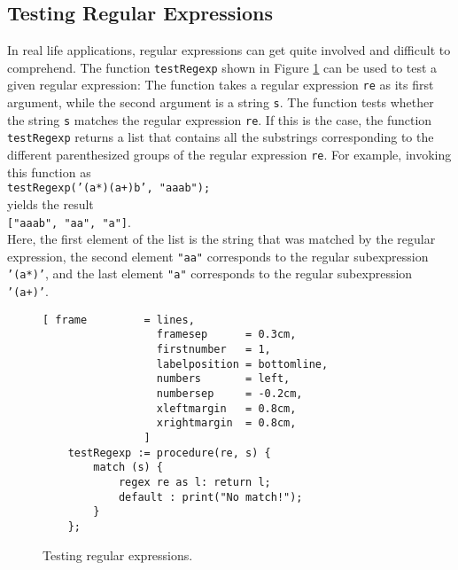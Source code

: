 \subsection{Testing Regular Expressions}
In real life applications, regular expressions can get quite involved and difficult to
comprehend.  The function \texttt{testRegexp} shown in Figure \ref{fig:test-regexp.stlx}
can be used to test a given regular expression:  The function takes a regular expression
\texttt{re} as its first argument, while the second argument is a string \texttt{s}.  The
function tests whether the string \texttt{s} matches the regular expression \texttt{re}.
If this is the case, the function \texttt{testRegexp} returns a list that contains all the
substrings corresponding to the different parenthesized groups of the regular expression
\texttt{re}.   For example,  invoking this function as
\\[0.2cm]
\hspace*{1.3cm}
\texttt{testRegexp('(a*)(a+)b', "aaab");}
\\[0.2cm]
yields the result
\\[0.2cm]
\hspace*{1.3cm}
\texttt{["aaab", "aa", "a"]}.
\\[0.2cm]
Here, the first element of the list is the string that was matched by the regular
expression, the second element \texttt{"aa"} corresponds to the regular subexpression
\texttt{'(a*)'}, and the last element \texttt{"a"} corresponds to the regular
subexpression \texttt{'(a+)'}.

\begin{figure}[!ht]
\centering
\begin{Verbatim}[ frame         = lines, 
                  framesep      = 0.3cm, 
                  firstnumber   = 1,
                  labelposition = bottomline,
                  numbers       = left,
                  numbersep     = -0.2cm,
                  xleftmargin   = 0.8cm,
                  xrightmargin  = 0.8cm,
                ]
    testRegexp := procedure(re, s) {
        match (s) {
            regex re as l: return l;
            default : print("No match!");
        }
    };
\end{Verbatim}
\vspace*{-0.3cm}
\caption{Testing regular expressions.}
\label{fig:test-regexp.stlx}
\end{figure}

